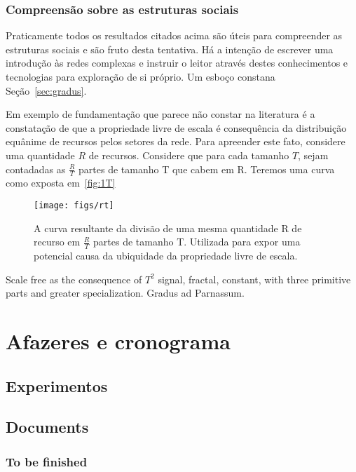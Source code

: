 \documentclass[a4paper,openright,12pt]{report} %
\begin{document}
\subsection{Compreensão sobre as estruturas sociais}
Praticamente todos os resultados citados acima
são úteis para compreender as estruturas sociais e são
fruto desta tentativa.
Há a intenção de escrever uma introdução às redes complexas
e instruir o leitor através destes conhecimentos e tecnologias
para exploração de si próprio. Um esboço
constana Seção~\ref{sec:gradus}.

Em exemplo de fundamentação que parece não 
constar na literatura é a constatação de que
a propriedade livre de escala é consequência da distribuição
equânime de recursos pelos setores da rede. 
Para apreender este fato, considere uma quantidade $R$ de recursos.
Considere que para cada tamanho $T$, sejam contadadas as $\frac{R}{T}$ partes de tamanho T que cabem em R.
Teremos uma curva como exposta em~\ref{fig:1T}

\begin{figure}[!h]
	\centering
	\texttt{[image: figs/rt]}
	\caption{A curva resultante da divisão de uma mesma quantidade
	R de recurso em $\frac{R}{T}$ partes de tamanho T.
        Utilizada para expor uma potencial causa da ubiquidade da
        propriedade livre de escala.}
	\label{formationNetwork}
\end{figure}




Scale free as the consequence of $T^2$ signal, fractal, constant, with three primitive parts and greater specialization. Gradus ad Parnassum.

\chapter{Afazeres e cronograma}
\section{Experimentos}\label{sec:exp}
\section{Documents}
\subsection{To be finished}
\end{document}

